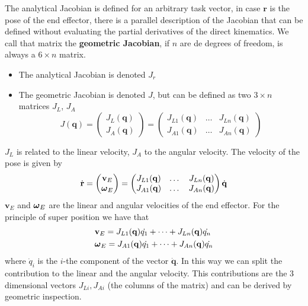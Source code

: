 \documentclass[10pt, letterpaper]{report}
\begin{document}
The analytical Jacobian is defined for an arbitrary task vector, in case $\mathbf r$ is the pose of the end effector, there is a parallel description of the Jacobian that can be defined without evaluating the partial derivatives of the direct kinematics. We call that matrix the \textbf{geometric Jacobian}, if $n$ are de degrees of freedom, is always a $6\times n$ matrix.\begin{itemize}
    \item The analytical Jacobian is denoted $J_r$
    \item The geometric Jacobian is denoted $J$, but can be defined as two $3\times n$ matrices $J_L$, $J_A$\begin{equation}
        J(\mathbf q)=\begin{pmatrix}
             J_L(\mathbf q)\\  J_A(\mathbf q)
        \end{pmatrix}=\begin{pmatrix}
             J_{L1}(\mathbf q)&\dots &J_{Ln}(\mathbf q)\\
             J_{A1}(\mathbf q)&\dots &J_{An}(\mathbf q)
        \end{pmatrix}
    \end{equation}
\end{itemize}
$J_L$ is related to the linear velocity, $J_A$ to the angular velocity. The velocity of the pose is given by\begin{equation}
    \dot{\mathbf r}=\begin{pmatrix}
        \mathbf v_E\\ 
        {\boldsymbol{\omega}}_E
    \end{pmatrix}=\begin{pmatrix}
             J_{L1}(\mathbf q)&\dots &J_{Ln}(\mathbf q)\\
             J_{A1}(\mathbf q)&\dots &J_{An}(\mathbf q)
        \end{pmatrix}\dot{\mathbf q}
\end{equation}
$ \mathbf v_E$ and $ 
        {\boldsymbol{\omega}}_E$ are the linear and angular velocities of the end effector. For the principle of super position we have that\begin{align}
            &\mathbf v_E=J_{L1}(\mathbf q)\dot{ q_1}+\dots +J_{Ln}(\mathbf q)\dot{ q_n}\\
             &{\boldsymbol{\omega}}_E=J_{A1}(\mathbf q)\dot{ q_1}+\dots +J_{An}(\mathbf q)\dot{ q_n}
        \end{align}
where $\dot q_i$ is the $i$-the component of the vector $\dot{\mathbf q}$. In this way we can split the contribution to the linear and the angular velocity. This contributions are the 3 dimensional vectors $J_{Li},J_{Ai}$ (the columns of the matrix) and can be derived by geometric inspection.
\end{document}
